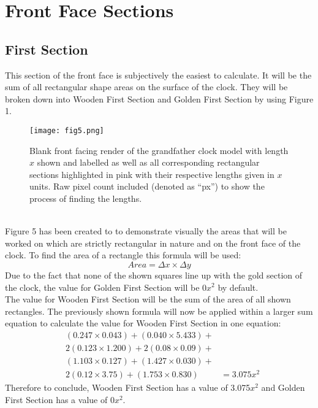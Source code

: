 \documentclass[a4paper,12pt]{article}
\begin{document}
\section{Front Face Sections}

\subsection{First Section}
This section of the front face is subjectively the easiest to calculate. It will be the sum of all rectangular shape areas on the surface of the clock. They will be broken down into Wooden First Section and Golden First Section by using Figure 1.\\
\begin{figure}[h!]
\centering
\texttt{[image: fig5.png]}
\caption{Blank front facing render of the grandfather clock model with length $x$ shown and labelled as well as all corresponding rectangular sections highlighted in pink with their respective lengths given in $x$ units. Raw pixel count included (denoted as ``px'') to show the process of finding the lengths.}
\label{fig:clock5}
\end{figure}
\\Figure 5 has been created to to demonstrate visually the areas that will be worked on which are strictly rectangular in nature and on the front face of the clock. To find the area of a rectangle this formula will be used: $$Area = \Delta x \times \Delta y$$
Due to the fact that none of the shown squares line up with the gold section of the clock, the value for Golden First Section will be 0$x^2$ by default.
\\The value for Wooden First Section will be the sum of the area of all shown rectangles. The previously shown formula will now be applied within a larger sum equation to calculate the value for Wooden First Section in one equation: 
\begin{equation}
\begin{aligned} 
&(0.247\times0.043)+(0.040\times5.433)+\\&2(0.123\times1.200)+2(0.08\times0.09)+\\&(1.103\times0.127)+(1.427\times0.030)+\\&2(0.12\times3.75)+(1.753\times0.830) &=3.075x^2 
\end{aligned}
\end{equation}
Therefore to conclude, Wooden First Section has a value of 3.075$x^2$ and Golden First Section has a value of 0$x^2$.
\end{document}
